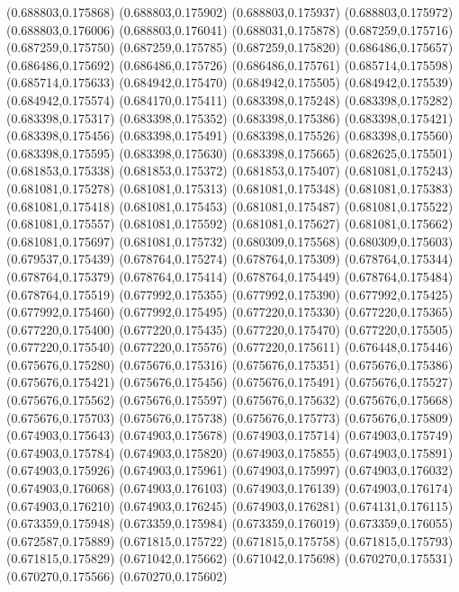 (0.688803,0.175868)
(0.688803,0.175902)
(0.688803,0.175937)
(0.688803,0.175972)
(0.688803,0.176006)
(0.688803,0.176041)
(0.688031,0.175878)
(0.687259,0.175716)
(0.687259,0.175750)
(0.687259,0.175785)
(0.687259,0.175820)
(0.686486,0.175657)
(0.686486,0.175692)
(0.686486,0.175726)
(0.686486,0.175761)
(0.685714,0.175598)
(0.685714,0.175633)
(0.684942,0.175470)
(0.684942,0.175505)
(0.684942,0.175539)
(0.684942,0.175574)
(0.684170,0.175411)
(0.683398,0.175248)
(0.683398,0.175282)
(0.683398,0.175317)
(0.683398,0.175352)
(0.683398,0.175386)
(0.683398,0.175421)
(0.683398,0.175456)
(0.683398,0.175491)
(0.683398,0.175526)
(0.683398,0.175560)
(0.683398,0.175595)
(0.683398,0.175630)
(0.683398,0.175665)
(0.682625,0.175501)
(0.681853,0.175338)
(0.681853,0.175372)
(0.681853,0.175407)
(0.681081,0.175243)
(0.681081,0.175278)
(0.681081,0.175313)
(0.681081,0.175348)
(0.681081,0.175383)
(0.681081,0.175418)
(0.681081,0.175453)
(0.681081,0.175487)
(0.681081,0.175522)
(0.681081,0.175557)
(0.681081,0.175592)
(0.681081,0.175627)
(0.681081,0.175662)
(0.681081,0.175697)
(0.681081,0.175732)
(0.680309,0.175568)
(0.680309,0.175603)
(0.679537,0.175439)
(0.678764,0.175274)
(0.678764,0.175309)
(0.678764,0.175344)
(0.678764,0.175379)
(0.678764,0.175414)
(0.678764,0.175449)
(0.678764,0.175484)
(0.678764,0.175519)
(0.677992,0.175355)
(0.677992,0.175390)
(0.677992,0.175425)
(0.677992,0.175460)
(0.677992,0.175495)
(0.677220,0.175330)
(0.677220,0.175365)
(0.677220,0.175400)
(0.677220,0.175435)
(0.677220,0.175470)
(0.677220,0.175505)
(0.677220,0.175540)
(0.677220,0.175576)
(0.677220,0.175611)
(0.676448,0.175446)
(0.675676,0.175280)
(0.675676,0.175316)
(0.675676,0.175351)
(0.675676,0.175386)
(0.675676,0.175421)
(0.675676,0.175456)
(0.675676,0.175491)
(0.675676,0.175527)
(0.675676,0.175562)
(0.675676,0.175597)
(0.675676,0.175632)
(0.675676,0.175668)
(0.675676,0.175703)
(0.675676,0.175738)
(0.675676,0.175773)
(0.675676,0.175809)
(0.674903,0.175643)
(0.674903,0.175678)
(0.674903,0.175714)
(0.674903,0.175749)
(0.674903,0.175784)
(0.674903,0.175820)
(0.674903,0.175855)
(0.674903,0.175891)
(0.674903,0.175926)
(0.674903,0.175961)
(0.674903,0.175997)
(0.674903,0.176032)
(0.674903,0.176068)
(0.674903,0.176103)
(0.674903,0.176139)
(0.674903,0.176174)
(0.674903,0.176210)
(0.674903,0.176245)
(0.674903,0.176281)
(0.674131,0.176115)
(0.673359,0.175948)
(0.673359,0.175984)
(0.673359,0.176019)
(0.673359,0.176055)
(0.672587,0.175889)
(0.671815,0.175722)
(0.671815,0.175758)
(0.671815,0.175793)
(0.671815,0.175829)
(0.671042,0.175662)
(0.671042,0.175698)
(0.670270,0.175531)
(0.670270,0.175566)
(0.670270,0.175602)
